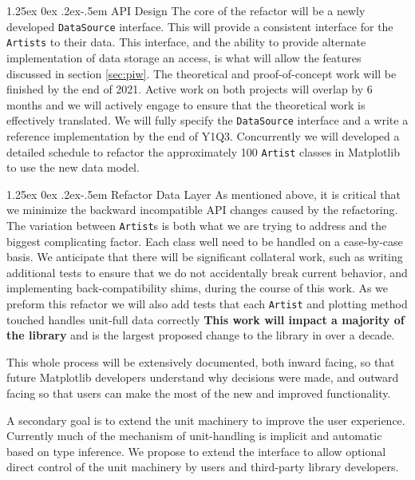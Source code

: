 \documentclass[12pt]{article}
\makeatletter
\numberwithin{page}{section}
\renewcommand{\paragraph}{%
  \@startsection{paragraph}{4}%
  {\z@}{1.25ex \@plus 0ex \@minus .2ex}{-.5em}%
  {\normalfont\normalsize\itshape\bfseries}%
}
\makeatother
\begin{document}
\paragraph{API Design} The core of the refactor will be a newly developed \texttt{DataSource}
interface.  This will provide a consistent interface for the
\texttt{Artists} to their data.  This interface, and the ability to
provide alternate implementation of data storage an access, is what
will allow the features discussed in section \ref{sec:piw}.  The
theoretical and proof-of-concept work will be finished by the end of
2021.  Active work on both projects will overlap by 6 months and we
will actively engage to ensure that the theoretical work is
effectively translated.  We will fully specify the \texttt{DataSource}
interface and a write a reference implementation by the end of Y1Q3.
Concurrently we will developed a detailed schedule to refactor the
approximately 100 \texttt{Artist} classes in Matplotlib to use the new
data model.

\paragraph{Refactor Data Layer} As mentioned above, it is critical that we minimize the backward
incompatible API changes caused by the refactoring.  The variation
between \texttt{Artist}s is both what we are trying to address and the
biggest complicating factor.  Each class well need to be handled on a
case-by-case basis.  We anticipate that there will be significant
collateral work, such as writing additional tests to ensure that we do
not accidentally break current behavior, and implementing
back-compatibility shims, during the course of this work.  As we
preform this refactor we will also add tests that each \texttt{Artist}
and plotting method touched handles unit-full data correctly
\textbf{This work will impact a majority of the library} and is the
largest proposed change to the library in over a decade.

This whole process will be extensively documented, both inward facing,
so that future Matplotlib developers understand why decisions were
made, and outward facing so that users can make the most of the new
and improved functionality.



A secondary goal is to extend the unit machinery to improve the user
experience.  Currently much of the mechanism of unit-handling is
implicit and automatic based on type inference.  We propose to extend
the interface to allow optional direct control of the unit machinery
by users and third-party library developers.
\end{document}
